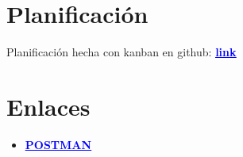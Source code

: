 \documentclass{article}
\begin{document}
\section{Planificación}
\quad Planificación hecha con kanban en github: \href{https://github.com/Nestorbd/Full-Stack-Proyect/projects/1}{\textbf{\textcolor{blue}{\underline{link}}}}
\section{Enlaces}

\begin{itemize}
  \item  \href{https://documenter.getpostman.com/view/12915886/TVspjUfE}{\textbf{\textcolor{blue}{\underline{POSTMAN}}}}
\end{itemize}
\end{document}
